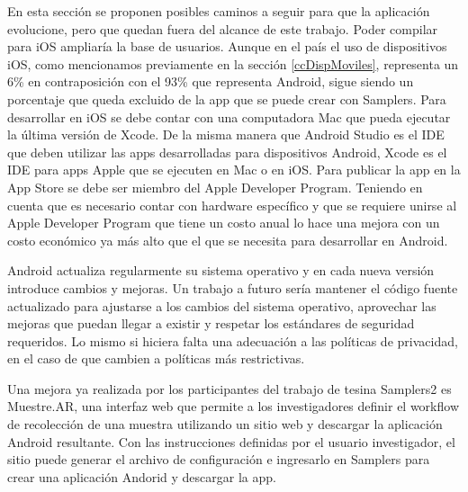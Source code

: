 En esta sección se proponen posibles caminos a seguir para que la aplicación evolucione, pero que quedan fuera del alcance de este trabajo. Poder compilar para iOS ampliaría la base de usuarios. Aunque en el país el uso de dispositivos iOS, como mencionamos previamente en la sección \ref{ccDispMoviles}, representa un 6\% en contraposición con el 93\% que representa Android, sigue siendo un porcentaje que queda excluido de la app que se puede crear con Samplers. Para desarrollar en iOS se debe contar con una computadora Mac que pueda ejecutar la última versión de Xcode. De la misma manera que Android Studio es el IDE que deben utilizar las apps desarrolladas para dispositivos Android, Xcode es el IDE para apps Apple que se ejecuten en Mac o en iOS. Para publicar la app en la App Store se debe ser miembro del Apple Developer Program. Teniendo en cuenta que es necesario contar con hardware específico \cite{appleDeveloper} y que se requiere unirse al Apple Developer Program que tiene un costo anual \cite{appleEnrollment} lo hace una mejora con un costo económico ya más alto que el que se necesita para desarrollar en Android. 

Android actualiza regularmente su sistema operativo y en cada nueva versión introduce cambios y mejoras. Un trabajo a futuro sería mantener el código fuente actualizado para ajustarse a los cambios del sistema operativo, aprovechar las mejoras que puedan llegar a existir y respetar los estándares de seguridad requeridos. Lo mismo si hiciera falta una adecuación a las políticas de privacidad, en el caso de que cambien a políticas más restrictivas. 

Una mejora ya realizada por los participantes del trabajo de tesina Samplers2 es Muestre.AR, una interfaz web que permite a los investigadores definir el workflow de recolección de una muestra utilizando un sitio web y descargar la aplicación Android resultante. Con las instrucciones definidas por el usuario investigador, el sitio puede generar el archivo de configuración e ingresarlo en Samplers para crear una aplicación Andorid y descargar la app. \cite{samplers2}








